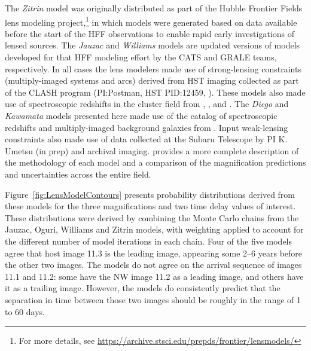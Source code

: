 The {\it Zitrin} model was originally distributed as part of the
Hubble Frontier Fields lens modeling project,\footnote{For more
  details, see
  \url{https://archive.stsci.edu/prepds/frontier/lensmodels/}} in
which models were generated based on data available before the start
of the HFF observations to enable rapid early investigations of lensed
sources. The {\it Jauzac} and {\it Williams} models are updated
versions of models developed for that HFF modeling effort by the CATS
and GRALE teams, respectively.  In all cases the lens modelers made
use of strong-lensing constraints (multiply-imaged systems and arcs)
derived from HST imaging collected as part of the CLASH program
(PI:Postman, HST PID:12459, \citealt{Postman:2012}). These models also
made use of spectroscopic redshifts in the cluster field from
\citet{Mann:2012}, \citet{Christensen:2012}, and \citet{Grillo:2015a}.
The {\it Diego} and {\it Kawamata} models presented here made use of the catalog of spectroscopic redshifts and multiply-imaged background galaxies from \citep{Caminha:2016}.
Input weak-lensing constraints also made use of data collected at the
Subaru Telescope by PI K. Umetsu (in prep) and archival imaging.
\citet{Priewe:2016} provides a more complete description of the
methodology of each model and a comparison of the magnification
predictions and uncertainties across the entire  field.

Figure~\ref{fig:LensModelContours} presents probability distributions
derived from these models for the three magnifications and two time
delay values of interest.  These distributions were derived by
combining the Monte Carlo chains from the Jauzac, Oguri, Williams and
Zitrin models, with weighting applied to account for the different
number of model iterations in each chain. Four of the five models
agree that host image 11.3 is the leading image, appearing some 2--6
years before the other two images.  The models do not agree on the
arrival sequence of images 11.1 and 11.2: some have the NW image 11.2
as a leading image, and others have it as a trailing image.  However,
the models do consistently predict that the separation in time between
those two images should be roughly in the range of 1 to 60 days.


